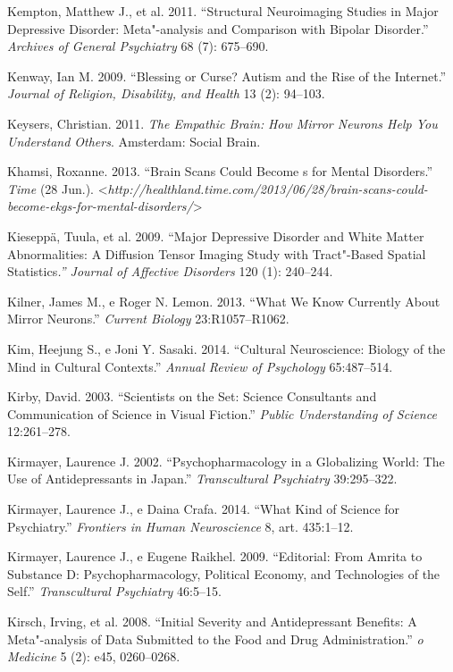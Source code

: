 Kempton, Matthew J., et al. 2011. ``Structural Neuroimaging Studies in
Major Depressive Disorder: Meta"-analysis and Comparison with Bipolar
Disorder.'' \emph{Archives of General Psychiatry} 68 (7): 675--690.

Kenway, Ian M. 2009. ``Blessing or Curse? Autism and the Rise of the
Internet.'' \emph{Journal of Religion, Disability, and Health} 13 (2):
94--103.

Keysers, Christian. 2011. \emph{The Empathic Brain:} \emph{How Mirror
Neurons Help You Understand Others}. Amsterdam: Social Brain.

Khamsi, Roxanne. 2013. ``Brain Scans Could Become s for Mental
Disorders.'' \emph{Time} (28 Jun.).
\textless{}\emph{http://healthland.time.com/2013/06/28/brain-scans-could-become-ekgs-for-mental-disorders/}\textgreater{}

Kieseppä, Tuula, et al. 2009. ``Major Depressive Disorder and White
Matter Abnormalities: A Diffusion Tensor Imaging Study with Tract"-Based
Spatial Statistics\emph{.'' Journal of Affective Disorders} 120 (1):
240--244.

Kilner, James M., e Roger N. Lemon. 2013. ``What We Know Currently About
Mirror Neurons.'' \emph{Current Biology} 23:R1057--R1062.

Kim, Heejung S., e Joni Y. Sasaki. 2014. ``Cultural Neuroscience:
Biology of the Mind in Cultural Contexts.'' \emph{Annual Review of
Psychology} 65:487--514.

Kirby, David. 2003. ``Scientists on the Set: Science Consultants and
Communication of Science in Visual Fiction.'' \emph{Public Understanding
of Science} 12:261--278.

Kirmayer, Laurence J. 2002. ``Psychopharmacology in a Globalizing World:
The Use of Antidepressants in Japan.'' \emph{Transcultural Psychiatry}
39:295--322.

Kirmayer, Laurence J., e Daina Crafa. 2014. ``What Kind of Science for
Psychiatry.'' \emph{Frontiers in Human Neuroscience} 8, art. 435:1--12.

Kirmayer, Laurence J., e Eugene Raikhel. 2009. ``Editorial: From Amrita
to Substance D: Psychopharmacology, Political Economy, and Technologies
of the Self.'' \emph{Transcultural Psychiatry} 46:5--15.

Kirsch, Irving, et al. 2008. ``Initial Severity and Antidepressant
Benefits: A Meta"-analysis of Data Submitted to the Food and Drug
Administration.'' \emph{o} \emph{Medicine} 5 (2): e45, 0260--0268.

